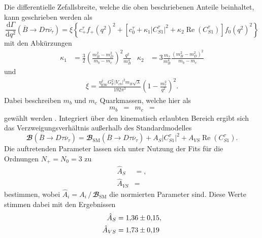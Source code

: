 Die differentielle Zefallsbreite, welche die oben beschriebenen Anteile beinhaltet, kann geschrieben werden als \cite{PhysRevD.88.094012}
\begin{equation}
  \label{eqn:wq_bsm}
  \frac{\mathrm{d} \Gamma}{\mathrm{d} q^2} \left(\overline{B} \to D \tau \overline{\nu_{\tau}} \right) = \xi \left\lbrace c_+^{\tau} f_+(q^2)^2 + \left\lbrack c_0^{\tau} + \kappa_1 \lvert C_{S1}^{\tau} \rvert^2 + \kappa_2 \operatorname{Re}(C_{S1}^{\tau}) \right\rbrack f_0(q^2)^2 \right\rbrace
\end{equation}
mit den Abkürzungen
\begin{align*}
  \kappa_1 &= \frac{3}{2} \left( \frac{m_B^2 - m_D^2}{m_b - m_c} \right)^2 \frac{q^2}{m_B^4} & \kappa_2 &= 3  \frac{m_\tau}{m_B^4} \frac{(m_B^2 - m_D^2)^2}{m_b - m_c}
\end{align*}
und
\begin{align*}
  \xi = \frac{\eta_\text{EW}^2 G_\text{F}^2 \lvert V_{cb} \rvert^2 m_B \sqrt{\lambda} }{192 \pi^3} \left( 1 - \frac{m_\tau^2}{q^2} \right)^2.
\end{align*}
Dabei beschreiben $m_b$ und $m_c$ Quarkmassen, welche hier als 
\begin{align*}
  m_b &=  & m_c &= 
\end{align*}
gewählt werden \cite{Agashe:2014kda}.
Integriert über den kinematisch erlaubten Bereich ergibt sich das Verzweigungsverhältnis außerhalb des Standardmodelles
\begin{equation}
  \label{eqn:R_bsm}
  {\mathbfcal{B}}\!\left(\overline{B} \to D \tau \overline{\nu}_\tau \right) = {\mathbfcal{B}}_\text{SM}\!\left(\overline{B} \to D \tau \overline{\nu}_\tau \right) + A_S \lvert C_{S1}^{\tau} \rvert^2 + A_{VS} \operatorname{Re}(C_{S1}^{\tau}).
\end{equation}
Die auftretenden Parameter lassen sich unter Nutzung der Fits für die Ordnungen $N_+ = N_0 = \num{3}$ zu
\begin{align*}
  \hat{A}_S &= , \\
  \hat{A}_{VS} &= 
\end{align*}
bestimmen, wobei $\hat{A}_i = A_i \,/\, {\mathbfcal{B}}_\text{SM}$ die normierten Parameter sind.
Diese Werte stimmen dabei mit den Ergebnissen
\begin{align*}
  \hat{A}_S &= \num{1.36+-0.15}, \\
  \hat{A}_{VS} &= \num{1.73+-0.19}
\end{align*}
